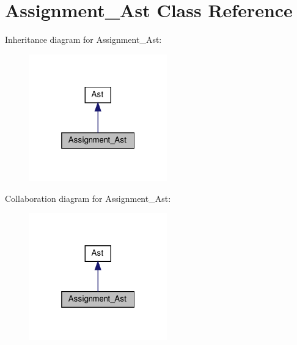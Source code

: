 \hypertarget{classAssignment__Ast}{}\section{Assignment\+\_\+\+Ast Class Reference}
\label{classAssignment__Ast}


Inheritance diagram for Assignment\+\_\+\+Ast\+:
\nopagebreak
\begin{figure}[H]
\begin{center}
\leavevmode
\includegraphics[width=169pt]{classAssignment__Ast__inherit__graph}
\end{center}
\end{figure}


Collaboration diagram for Assignment\+\_\+\+Ast\+:
\nopagebreak
\begin{figure}[H]
\begin{center}
\leavevmode
\includegraphics[width=169pt]{classAssignment__Ast__coll__graph}
\end{center}
\end{figure}
